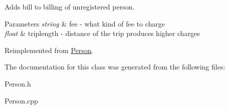 Adds bill to billing of unregistered person. 


\begin{DoxyParams}{Parameters}
{\em string} & fee -\/ what kind of fee to charge \\
\hline
{\em float} & triplength -\/ distance of the trip produces higher charges \\
\hline
\end{DoxyParams}


Reimplemented from \hyperlink{class_person}{Person}.



The documentation for this class was generated from the following files\+:\begin{DoxyCompactItemize}
\item 
Person.\+h\item 
Person.\+cpp\end{DoxyCompactItemize}
